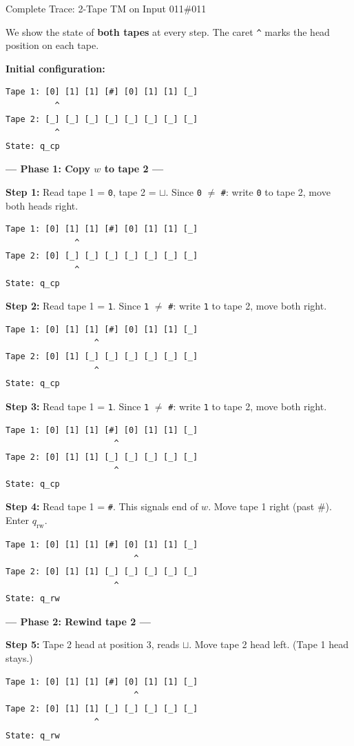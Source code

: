 \documentclass[11pt,a4paper]{article}
\begin{document}
\begin{examplebox}{{Complete Trace: 2-Tape TM on Input 011\#011}}

We show the state of \textbf{both tapes} at every step. The caret \texttt{\^{}} marks the head position on each tape.

\textbf{Initial configuration:}
\begin{lstlisting}
Tape 1: [0] [1] [1] [#] [0] [1] [1] [_]
          ^
Tape 2: [_] [_] [_] [_] [_] [_] [_] [_]
          ^
State: q_cp
\end{lstlisting}

\textbf{--- Phase 1: Copy $w$ to tape 2 ---}

\textbf{Step 1:} Read tape 1 = \texttt{0}, tape 2 = $\sqcup$. Since \texttt{0} $\neq$ \texttt{\#}: write \texttt{0} to tape 2, move both heads right.
\begin{lstlisting}
Tape 1: [0] [1] [1] [#] [0] [1] [1] [_]
              ^
Tape 2: [0] [_] [_] [_] [_] [_] [_] [_]
              ^
State: q_cp
\end{lstlisting}

\textbf{Step 2:} Read tape 1 = \texttt{1}. Since \texttt{1} $\neq$ \texttt{\#}: write \texttt{1} to tape 2, move both right.
\begin{lstlisting}
Tape 1: [0] [1] [1] [#] [0] [1] [1] [_]
                  ^
Tape 2: [0] [1] [_] [_] [_] [_] [_] [_]
                  ^
State: q_cp
\end{lstlisting}

\textbf{Step 3:} Read tape 1 = \texttt{1}. Since \texttt{1} $\neq$ \texttt{\#}: write \texttt{1} to tape 2, move both right.
\begin{lstlisting}
Tape 1: [0] [1] [1] [#] [0] [1] [1] [_]
                      ^
Tape 2: [0] [1] [1] [_] [_] [_] [_] [_]
                      ^
State: q_cp
\end{lstlisting}

\textbf{Step 4:} Read tape 1 = \texttt{\#}. This signals end of $w$. Move tape 1 right (past \#). Enter $q_{\text{rw}}$.
\begin{lstlisting}
Tape 1: [0] [1] [1] [#] [0] [1] [1] [_]
                          ^
Tape 2: [0] [1] [1] [_] [_] [_] [_] [_]
                      ^
State: q_rw
\end{lstlisting}

\textbf{--- Phase 2: Rewind tape 2 ---}

\textbf{Step 5:} Tape 2 head at position 3, reads $\sqcup$. Move tape 2 head left. (Tape 1 head stays.)
\begin{lstlisting}
Tape 1: [0] [1] [1] [#] [0] [1] [1] [_]
                          ^
Tape 2: [0] [1] [1] [_] [_] [_] [_] [_]
                  ^
State: q_rw
\end{lstlisting}


\end{examplebox}
\end{document}
